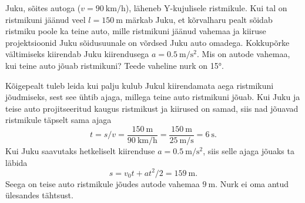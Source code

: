 
Juku, sõites autoga ($v = \SI{90}{\kilo\meter\per\hour}$), läheneb Y-kujulisele ristmikule. Kui tal on ristmikuni jäänud veel $l = \SI{150}{\meter}$ märkab Juku, et kõrvalharu pealt sõidab ristmiku poole ka teine auto, mille ristmikuni jäänud vahemaa ja kiiruse projektsioonid Juku sõidusuunale on võrdsed Juku auto omadega. Kokkupõrke vältimiseks kiirendab Juku kiirendusega $a = \SI{0.5}{\meter\per\second\squared}$. Mis on autode vahemaa, kui teine auto jõuab ristmikuni? Teede vaheline nurk on \ang{15}.


\hint
Kõigepealt tuleb leida kui palju kulub Jukul kiirendamata aega ristmikuni jõudmiseks, sest see ühtib ajaga, millega teine auto ristmikuni jõuab.\solu
Kui Juku ja teise auto projitseeritud kaugus ristmikust ja kiirused on samad, siis nad jõuavad ristmikule täpselt sama ajaga
\[
t = s/v = \frac{\SI{150}{\meter}}{\SI{90}{\kilo\meter\per\hour}} = \frac{\SI{150}{\meter}}{\SI{25}{\meter\per\second}} = \SI{6}{\second}.
\]
Kui Juku saavutaks hetkeliselt kiirenduse $a = \SI{0.5}{\meter\per\second\squared}$, siis selle ajaga jõuaks ta läbida
\[
s = v_0 t + a t^2/2 = \SI{159}{\meter}.
\]
Seega on teise auto ristmikule jõudes autode vahemaa $\SI{9}{\meter}$. Nurk ei oma antud ülesandes tähtsust.\probend